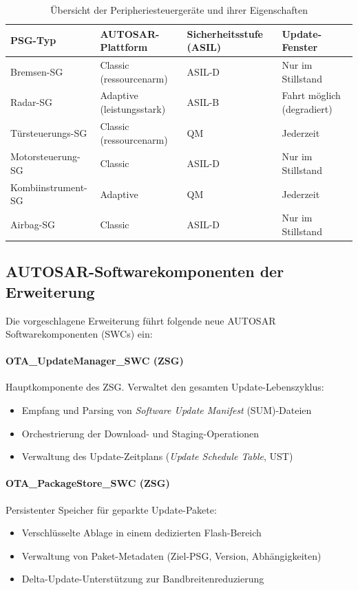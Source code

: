 ﻿\documentclass[12pt,a4paper,twoside]{article}
\begin{document}
\begin{table}[htbp]
  \centering
  \caption{Übersicht der Peripheriesteuergeräte und ihrer Eigenschaften}
  \label{tab:psgs}
  \begin{tabularx}{\textwidth}{lXXX}
    \toprule
    \textbf{PSG-Typ} & \textbf{AUTOSAR-Plattform} &
    \textbf{Sicherheitsstufe (ASIL)} & \textbf{Update-Fenster} \\
    \midrule
    Bremsen-SG & Classic (ressourcenarm) & ASIL-D & Nur im Stillstand \\
    Radar-SG & Adaptive (leistungsstark) & ASIL-B & Fahrt möglich (degradiert) \\
    Türsteuerungs-SG & Classic (ressourcenarm) & QM & Jederzeit \\
    Motorsteuerung-SG & Classic & ASIL-D & Nur im Stillstand \\
    Kombiinstrument-SG & Adaptive & QM & Jederzeit \\
    Airbag-SG & Classic & ASIL-D & Nur im Stillstand \\
    \bottomrule
  \end{tabularx}
\end{table}

\subsection{AUTOSAR-Softwarekomponenten der Erweiterung}
\label{subsec:swc}

Die vorgeschlagene Erweiterung führt folgende neue AUTOSAR
Softwarekomponenten (SWCs) ein:

\paragraph{OTA\_UpdateManager\_SWC (ZSG)}
Hauptkomponente des ZSG. Verwaltet den gesamten Update-Lebenszyklus:
\begin{itemize}
  \item Empfang und Parsing von \textit{Software Update Manifest} (SUM)-Dateien
  \item Orchestrierung der Download- und Staging-Operationen
  \item Verwaltung des Update-Zeitplans (\textit{Update Schedule Table}, UST)
\end{itemize}

\paragraph{OTA\_PackageStore\_SWC (ZSG)}
Persistenter Speicher für geparkte Update-Pakete:
\begin{itemize}
  \item Verschlüsselte Ablage in einem dedizierten Flash-Bereich
  \item Verwaltung von Paket-Metadaten (Ziel-PSG, Version, Abhängigkeiten)
  \item Delta-Update-Unterstützung zur Bandbreitenreduzierung
\end{itemize}
\end{document}
